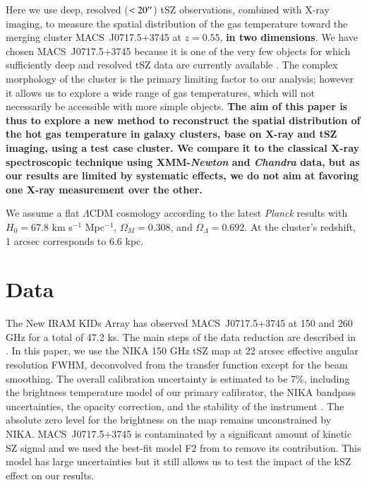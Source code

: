 \documentclass[twocolumn,traditabstract]{aa}
\begin{document}
Here we use deep, resolved ($< 20\hbox{$^{\prime\prime}$}$) tSZ observations, combined with X-ray imaging, to measure the spatial distribution of the gas temperature toward the merging cluster \mbox{MACS~J0717.5+3745} at $z=0.55$, {\bf in two dimensions}. We have chosen \mbox{MACS~J0717.5+3745} because it is one of the very few objects for which sufficiently deep and resolved tSZ data are currently available \citep{Adam2016b}. The complex morphology of the cluster is the primary limiting factor to our analysis; however it allows us to explore a wide range of gas temperatures, which will not necessarily be accessible with more simple objects. {\bf The aim of this paper is thus to explore a new method to reconstruct the spatial distribution of the hot gas temperature in galaxy clusters, base on X-ray and tSZ imaging, using a test case cluster. We compare it to the classical X-ray spectroscopic technique using XMM-\textit{Newton} and \textit{Chandra} data, but as our results are limited by systematic effects, we do not aim at favoring one X-ray measurement over the other.}

We assume a flat $\Lambda$CDM cosmology according to the latest {\it Planck} results \citep{Planck2015XIII} with $H_0 = 67.8$ km s$^{-1}$ Mpc$^{-1}$, $\Omega_M = 0.308$, and $\Omega_{\Lambda} = 0.692$. At the cluster's redshift, 1 arcsec corresponds to 6.6 kpc.

\section{Data}\label{sec:data}
The New IRAM KIDs Array \citep[NIKA, see][]{Monfardini2011,Calvo2013,Adam2014,Catalano2014} has observed \mbox{MACS~J0717.5+3745} at 150 and 260 GHz for a total of 47.2 ks. The main steps of the data reduction are described in \cite{Adam2015,Adam2016a,Adam2016b,Ruppin2016}. In this paper, we use the NIKA 150 GHz tSZ map at 22 arcsec effective angular resolution FWHM, deconvolved from the transfer function except for the beam smoothing. The overall calibration uncertainty is estimated to be 7\%, including the brightness temperature model of our primary calibrator, the NIKA bandpass uncertainties, the opacity correction, and the stability of the instrument \citep{Catalano2014}. The absolute zero level for the brightness on the map remains unconstrained by NIKA. \mbox{MACS~J0717.5+3745} is contaminated by a significant amount of kinetic SZ \citep[kSZ,][]{Sunyaev1980} signal and we used the best-fit model F2 from \cite{Adam2016b} to remove its contribution. This model has large uncertainties but it still allows us to test the impact of the kSZ effect on our results.
\end{document}
